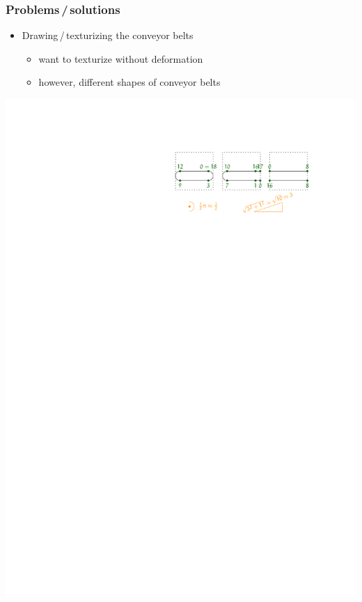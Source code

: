 \documentclass[12pt, aspectratio=169]{beamer} %
\begin{document}
\begin{frame}
  \frametitle{Problems\,/\,solutions}
  \begin{itemize}
    \item Drawing\,/\,texturizing the conveyor belts
    \begin{itemize}
      \item want to texturize without deformation
      \item however, different shapes of conveyor belts
    \end{itemize}
  \end{itemize}
  \begin{center}
    \includegraphics{imgs/sketch-texturing} %
  \end{center}
\end{frame}
\end{document}
